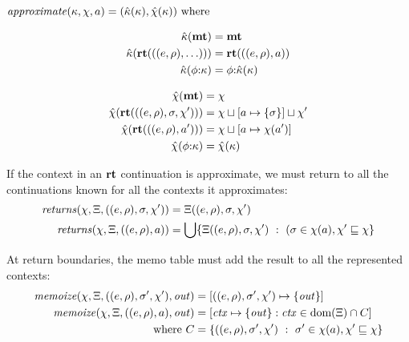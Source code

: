 \newcommand{\replacectx}{\hat\mkont} %
\newcommand{\addstore}{\hat\mmktab} %
\begin{center}
  $\approximate(\mkont, \mmktab, \maddr) = (\replacectx(\mkont), \addstore(\mkont)) \text{ where}$\\
  \begin{minipage}{0.45\linewidth}
    \begin{align*}
      \replacectx(\kmt) &= \kmt \\
      \replacectx(\krt{((\mexpr,\menv),\ldots)}) &= \krt{((\mexpr,\menv),\maddr)} \\
      \replacectx(\kcons{\mkframe}{\mkont}) &=
      \kcons{\mkframe}{\replacectx(\mkont)}
    \end{align*}
  \end{minipage}
  \begin{minipage}{0.50\linewidth}
    \begin{align*}
      \addstore(\kmt) &= \mmktab \\
      \addstore(\krt{((\mexpr,\menv),\mstore,\mmktab')}) &= \joinone{\mmktab}{\maddr}{\mstore}\sqcup \mmktab' \\
      \addstore(\krt{((\mexpr,\menv),\maddr')}) &= \joinm{\mmktab}{\maddr}{\mmktab(\maddr')} \\
      \addstore(\kcons{\mkframe}{\mkont}) &= \addstore(\mkont)
    \end{align*}
  \end{minipage}
\end{center}
%
If the context in an $\mathbf{rt}$ continuation is approximate, we must return to all the continuations known for all the contexts it approximates:
\begin{align*}
  \mathit{returns}(\chi, \Xi, ((e,\rho), \sigma, \chi')) &= \Xi((e,\rho), \sigma, \chi') \\
  \mathit{returns}(\chi, \Xi, ((e,\rho), a)) &=
    \bigcup\{ \Xi((e,\rho),\sigma,\chi')\ :\ (\sigma \in \chi(a), \chi' \sqsubseteq \chi\}
\end{align*}

At return boundaries, the memo table must add the result to all the represented contexts:
\begin{align*}
  \mathit{memoize}(\chi, \Xi, ((e,\rho), \sigma', \chi'), \mathit{out}) &=
  [((e,\rho), \sigma',\chi') \mapsto \{ {\mathit{out}} \}] \\
  \mathit{memoize}(\chi, \Xi, ((e,\rho), a), \mathit{out}) &= [\mathit{ctx} \mapsto \{ \mathit{out} \} : \mathit{ctx} \in \text{dom}(\Xi) \cap C] \\
    \text{where } C &= \{ ((e,\rho), \sigma', \chi')\ :\ \sigma' \in \chi(a), \chi' \sqsubseteq \chi\}
\end{align*}

